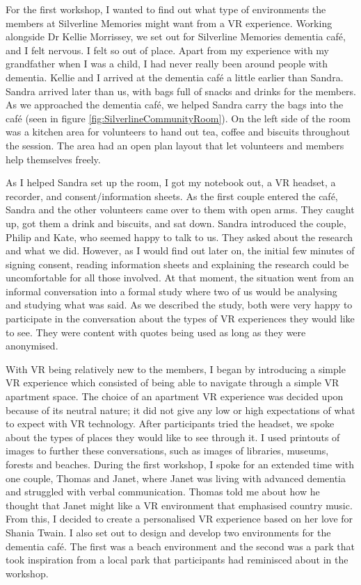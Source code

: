 For the first workshop, I wanted to find out what type of environments the members at Silverline Memories might want from a VR experience. Working alongside Dr Kellie Morrissey, we set out for Silverline Memories dementia café, and I felt nervous. I felt so out of place. Apart from my experience with my grandfather when I was a child, I had never really been around people with dementia. Kellie and I arrived at the dementia café a little earlier than Sandra. Sandra arrived later than us, with bags full of snacks and drinks for the members. As we approached the dementia café, we helped Sandra carry the bags into the  café (seen in figure \ref{fig:SilverlineCommunityRoom}). On the left side of the room was a kitchen area for volunteers to hand out tea, coffee and biscuits throughout the session. The area had an open plan layout that let volunteers and members help themselves freely. 

As I helped Sandra set up the room, I got my notebook out, a VR headset, a recorder, and consent/information sheets. As the first couple entered the café, Sandra and the other volunteers came over to them with open arms. They caught up, got them a drink and biscuits, and sat down. Sandra introduced the couple, Philip and Kate, who seemed happy to talk to us. They asked about the research and what we did. However, as I would find out later on, the initial few minutes of signing consent, reading information sheets and explaining the research could be uncomfortable for all those involved. At that moment, the situation went from an informal conversation into a formal study where two of us would be analysing and studying what was said. As we described the study, both were very happy to participate in the conversation about the types of VR experiences they would like to see. They were content with quotes being used as long as they were anonymised.

With VR being relatively new to the members, I began by introducing a simple VR experience which consisted of being able to navigate through a simple VR apartment space. The choice of an apartment VR experience was decided upon because of its neutral nature; it did not give any low or high expectations of what to expect with VR technology. After participants tried the headset, we spoke about the types of places they would like to see through it. I used printouts of images to further these conversations, such as images of libraries, museums, forests and beaches. During the first workshop, I spoke for an extended time with one couple, Thomas and Janet, where Janet was living with advanced dementia and struggled with verbal communication. Thomas told me about how he thought that Janet might like a VR environment that emphasised country music. From this, I decided to create a personalised VR experience based on her love for Shania Twain. I also set out to design and develop two environments for the dementia café. The first was a beach environment and the second was a park that took inspiration from a local park that participants had reminisced about in the workshop.

